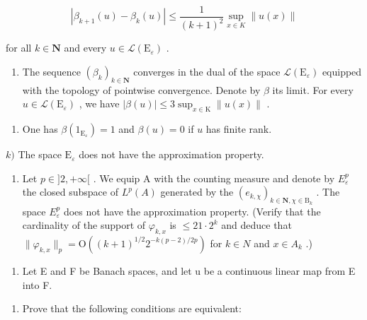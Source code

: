 \[
| \beta_ {k + 1} (u) - \beta_ {k} (u) | \leqslant \frac {1}{(k + 1) ^ {2}} \sup _ {x \in K} \| u (x) \|
\]

for all \(k \in \mathbf{N}\) and every \(u \in \mathcal{L}(\mathrm{E}_{\varepsilon})\) .

\begin{enumerate}
\def\labelenumi{\roman{enumi})}
\tightlist
\item
  The sequence \((\beta_{k})_{k\in \mathbf{N}}\) converges in the dual of the space \(\mathcal{L}(\mathrm{E}_{\varepsilon})\) equipped with the topology of pointwise convergence. Denote by \(\beta\) its limit. For every \(u\in \mathcal{L}(\mathrm{E}_{\varepsilon})\) , we have \(|\beta (u)|\leqslant 3\sup_{x\in \mathrm{K}}\| u(x)\|\) .
\end{enumerate}

\begin{enumerate}
\def\labelenumi{\alph{enumi})}
\setcounter{enumi}{9}
\tightlist
\item
  One has \(\beta(1_{\mathrm{E}_{\varepsilon}})=1\) and \(\beta(u)=0\) if \(u\) has finite rank.
\end{enumerate}

\(k)\) The space \(\mathrm{E}_{\varepsilon}\) does not have the approximation property.

\begin{enumerate}
\def\labelenumi{\alph{enumi})}
\setcounter{enumi}{11}
\tightlist
\item
  Let \(p \in]2, +\infty[\) . We equip A with the counting measure and denote by \(E_{\varepsilon}^{p}\) the closed subspace of \(L^{p}(A)\) generated by the \((e_{k,\chi})_{k \in \mathbf{N}, \chi \in \mathrm{B}_{k}}\) . The space \(E_{\varepsilon}^{p}\) does not have the approximation property. (Verify that the cardinality of the support of \(\varphi_{k,x}\) is \(\leqslant 21 \cdot 2^{k}\) and deduce that \(\|\varphi_{k,x}\|_{p} = \mathrm{O}((k+1)^{1/2}2^{-k(p-2)/2p})\) for \(k \in N\) and \(x \in A_{k}\) .)
\end{enumerate}

\begin{enumerate}
\def\labelenumi{\arabic{enumi})}
\setcounter{enumi}{25}
\tightlist
\item
  Let E and F be Banach spaces, and let u be a continuous linear map from E into F.
\end{enumerate}

\begin{enumerate}
\def\labelenumi{\alph{enumi})}
\tightlist
\item
  Prove that the following conditions are equivalent:
\end{enumerate}

